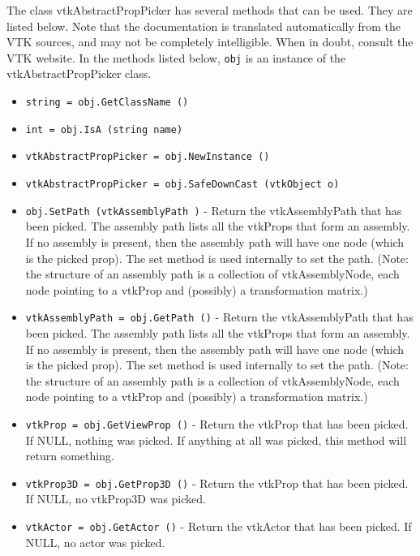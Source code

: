 The class vtkAbstractPropPicker has several methods that can be used.
  They are listed below.
Note that the documentation is translated automatically from the VTK sources,
and may not be completely intelligible.  When in doubt, consult the VTK website.
In the methods listed below, \verb|obj| is an instance of the vtkAbstractPropPicker class.
\begin{itemize}
\item  \verb|string = obj.GetClassName ()|

\item  \verb|int = obj.IsA (string name)|

\item  \verb|vtkAbstractPropPicker = obj.NewInstance ()|

\item  \verb|vtkAbstractPropPicker = obj.SafeDownCast (vtkObject o)|

\item  \verb|obj.SetPath (vtkAssemblyPath )| -  Return the vtkAssemblyPath that has been picked. The assembly path lists
 all the vtkProps that form an assembly. If no assembly is present, then
 the assembly path will have one node (which is the picked prop). The
 set method is used internally to set the path. (Note: the structure of
 an assembly path is a collection of vtkAssemblyNode, each node pointing
 to a vtkProp and (possibly) a transformation matrix.)

\item  \verb|vtkAssemblyPath = obj.GetPath ()| -  Return the vtkAssemblyPath that has been picked. The assembly path lists
 all the vtkProps that form an assembly. If no assembly is present, then
 the assembly path will have one node (which is the picked prop). The
 set method is used internally to set the path. (Note: the structure of
 an assembly path is a collection of vtkAssemblyNode, each node pointing
 to a vtkProp and (possibly) a transformation matrix.)

\item  \verb|vtkProp = obj.GetViewProp ()| -  Return the vtkProp that has been picked. If NULL, nothing was picked.
 If anything at all was picked, this method will return something.

\item  \verb|vtkProp3D = obj.GetProp3D ()| -  Return the vtkProp that has been picked. If NULL, no vtkProp3D was picked.

\item  \verb|vtkActor = obj.GetActor ()| -  Return the vtkActor that has been picked. If NULL, no actor was picked.


\end{itemize}
